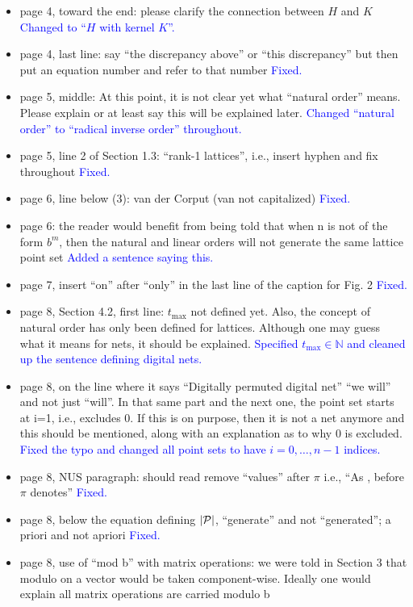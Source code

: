 \documentclass{article}
\newcommand{\response}[1]{{\newline \textcolor{blue}{#1}}}
\newcommand{\fixed}{\response{Fixed.}}
\begin{document}
\begin{itemize}
    \fixed 
    \item page 4, toward the end: please clarify the connection between $H$ and $K$
    \response{Changed to ``$H$ with kernel $K$''.} 
    \item page 4, last line: say “the discrepancy above” or “this discrepancy” but then put an equation number and refer to that number
    \fixed
    \item page 5, middle: At this point, it is not clear yet what “natural order” means. Please explain or at least say this will be explained later.
    \response{Changed ``natural order'' to ``radical inverse order'' throughout.} 
    \item page 5, line 2 of Section 1.3: “rank-1 lattices”, i.e., insert hyphen and fix throughout
    \fixed 
    \item page 6, line below (3): van der Corput (van not capitalized)
    \fixed 
    \item page 6: the reader would benefit from being told that when n is not of the form $b^m$, then the natural and linear orders will not generate the same lattice point set
    \response{Added a sentence saying this.} 
    \item page 7, insert “on” after “only” in the last line of the caption for Fig. 2
    \fixed 
    \item page 8, Section 4.2, first line: $t_\mathrm{max}$ not defined yet. Also, the concept of natural order has only been defined for lattices. Although one may guess what it means for nets, it should be explained.
    \response{Specified $t_\mathrm{max} \in \mathbb{N}$ and cleaned up the sentence defining digital nets.}
    \item page 8, on the line where it says “Digitally permuted digital net” “we will” and not just “will”. In that same part and the next one, the point set starts at i=1, i.e., excludes 0. If this is on purpose, then it is not a net anymore and this should be mentioned, along with an explanation as to why 0 is excluded.
    \response{Fixed the typo and changed all point sets to have $i=0,\dots,n-1$ indices.}
    \item page 8, NUS paragraph: should read remove “values” after $\pi$ i.e., “As , before $\pi$ denotes”
    \fixed
    \item page 8, below the equation defining $|{\cal P}|$, “generate” and not “generated”; a priori and not apriori
    \fixed 
    \item page 8, use of “mod b” with matrix operations: we were told in Section 3 that modulo on a vector would be taken component-wise. Ideally one would explain all matrix operations are carried modulo b

\end{itemize}
\end{document}
